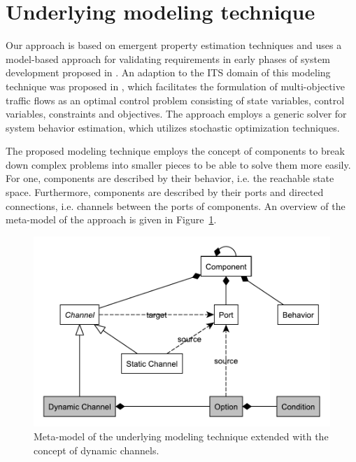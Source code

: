 \section{Underlying modeling technique}
\label{section:contribution_0}

Our approach is based on emergent property estimation techniques \cite{hackenberg2012towards} and uses a model-based approach for validating requirements in early phases of system development proposed in \cite{hackenberg2014rapid}. An adaption to the ITS domain of this modeling technique was proposed in \cite{ascher2014early}, which facilitates the formulation of multi-objective traffic flows as an optimal control problem consisting of state variables, control variables, constraints and objectives. The approach employs a generic solver for system behavior estimation, which utilizes stochastic optimization techniques.

The proposed modeling technique employs the concept of components to break down complex problems into smaller pieces to be able to solve them more easily. For one, components are described by their behavior, i.e. the reachable state space. Furthermore, components are described by their ports and directed connections, i.e. channels between the ports of components. An overview of the meta-model of the approach is given in Figure~\ref{fig:meta_model}.

\begin{figure}[h]
	\centering
	\includegraphics[width=\columnwidth]{../gfx/meta_model2.pdf}
	\caption{Meta-model of the underlying modeling technique extended with the concept of dynamic channels.}
	\label{fig:meta_model}
\end{figure}

